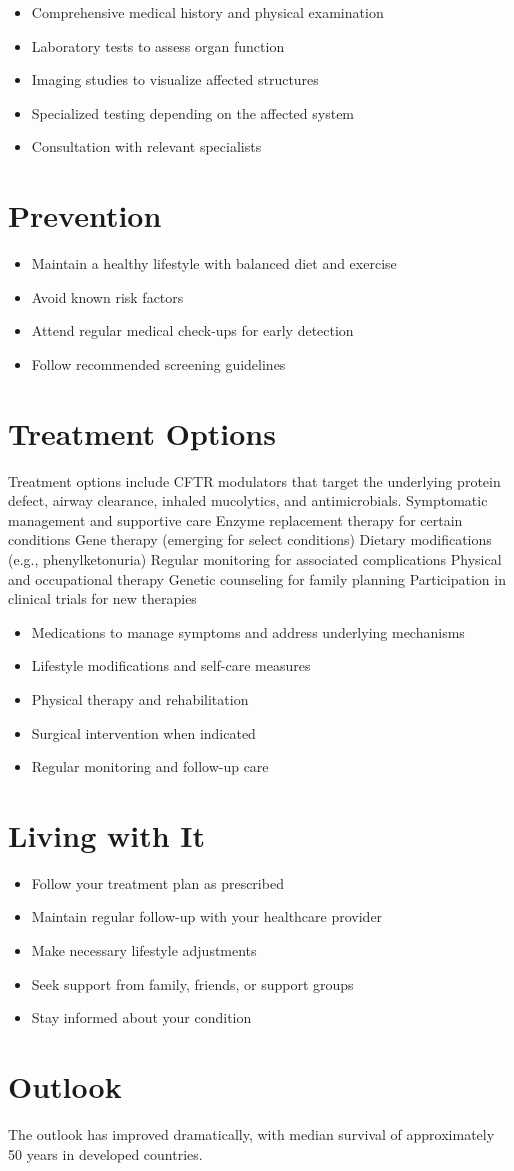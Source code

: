 \begin{itemize}[noitemsep]
  \item Comprehensive medical history and physical examination
  \item Laboratory tests to assess organ function
  \item Imaging studies to visualize affected structures
  \item Specialized testing depending on the affected system
  \item Consultation with relevant specialists
\end{itemize}
\section{Prevention}
\begin{itemize}[noitemsep]
  \item Maintain a healthy lifestyle with balanced diet and exercise
  \item Avoid known risk factors
  \item Attend regular medical check-ups for early detection
  \item Follow recommended screening guidelines
\end{itemize}
\section{Treatment Options}
Treatment options include CFTR modulators that target the underlying protein defect, airway clearance, inhaled mucolytics, and antimicrobials. Symptomatic management and supportive care Enzyme replacement therapy for certain conditions Gene therapy (emerging for select conditions) Dietary modifications (e.g., phenylketonuria) Regular monitoring for associated complications Physical and occupational therapy Genetic counseling for family planning Participation in clinical trials for new therapies

\begin{itemize}[noitemsep]
  \item Medications to manage symptoms and address underlying mechanisms
  \item Lifestyle modifications and self-care measures
  \item Physical therapy and rehabilitation
  \item Surgical intervention when indicated
  \item Regular monitoring and follow-up care
\end{itemize}
\section{Living with It}
\begin{itemize}[noitemsep]
  \item Follow your treatment plan as prescribed
  \item Maintain regular follow-up with your healthcare provider
  \item Make necessary lifestyle adjustments
  \item Seek support from family, friends, or support groups
  \item Stay informed about your condition
\end{itemize}
\section{Outlook}
The outlook has improved dramatically, with median survival of approximately 50 years in developed countries.
